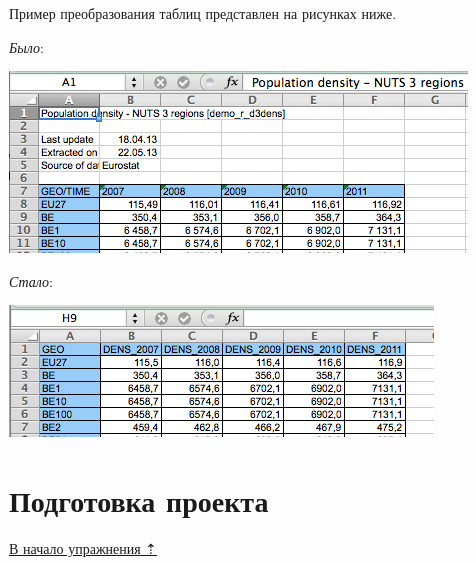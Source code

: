 \documentclass[]{book}
\theoremstyle{definition}
\theoremstyle{definition}
\theoremstyle{definition}
\theoremstyle{remark}
\begin{document}
Пример преобразования таблиц представлен на рисунках ниже.

\emph{Было}:

\includegraphics{images/Ex08/image15.png}

\emph{Стало}:

\includegraphics{images/Ex08/image16.png}

\hypertarget{stat-map-economic-prepare}{%
\section{Подготовка проекта}\label{stat-map-economic-prepare}}

\protect\hyperlink{stat-map-economic}{В начало упражнения ⇡}
\end{document}
